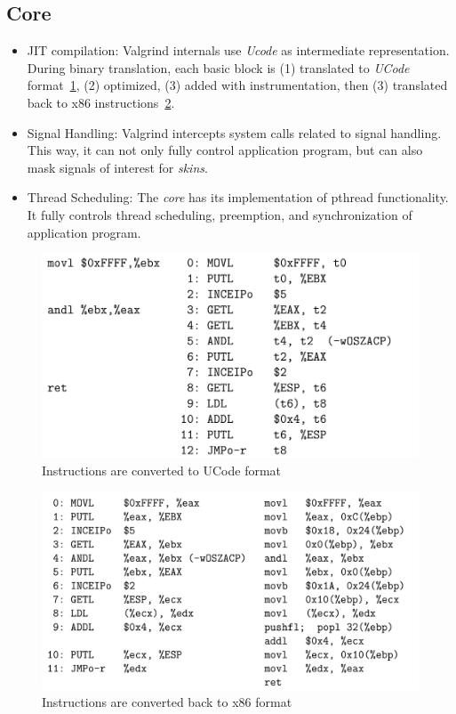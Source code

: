 \subsection{Core}

\begin{itemize}
    \item JIT compilation: Valgrind internals use \textit{Ucode} as intermediate representation. During binary translation, each basic block is (1) translated to \textit{UCode} format~\ref{fig:valgrind_UCode}, (2) optimized, (3) added with instrumentation, then (3) translated back to x86 instructions~\ref{fig:valgrind_UCode_back}.
    \item Signal Handling: Valgrind intercepts system calls related to signal handling. This way, it can not only fully control application program, but can also mask signals of interest for \textit{skins}.
    \item Thread Scheduling: The \textit{core} has its implementation of pthread functionality. It fully controls thread scheduling, preemption, and synchronization of application program.
\end{itemize}

\begin{figure}
    \centering
    \includegraphics[width=0.55\linewidth]{figures/Valgrind_UCode.png}
    \caption{Instructions are converted to UCode format\cite{valgrind}}
    \label{fig:valgrind_UCode}
\end{figure}

\begin{figure}
    \centering
    \includegraphics[width=0.55\linewidth]{figures/Valgrind_UCode_2.png}
    \caption{Instructions are converted back to x86 format\cite{valgrind}}
    \label{fig:valgrind_UCode_back}
\end{figure}

